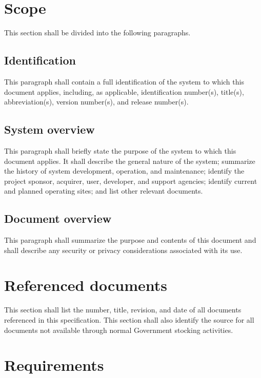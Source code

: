 \section{Scope}

This section shall be divided into the following paragraphs.

\subsection{Identification}

This paragraph shall contain a full identification of the system to
which this document applies, including, as applicable, identification
number(s), title(s), abbreviation(s), version number(s), and release
number(s).

\subsection{System overview}

This paragraph shall briefly state the purpose of the system to which
this document applies. It shall describe the general nature of the
system; summarize the history of system development, operation, and
maintenance; identify the project sponsor, acquirer, user, developer,
and support agencies; identify current and planned operating sites; and
list other relevant documents.

\subsection{Document overview}

This paragraph shall summarize the purpose and contents of this document
and shall describe any security or privacy considerations associated
with its use.

\section{Referenced documents}

This section shall list the number, title, revision, and date of all
documents referenced in this specification. This section shall also
identify the source for all documents not available through normal
Government stocking activities.

\section{Requirements}

